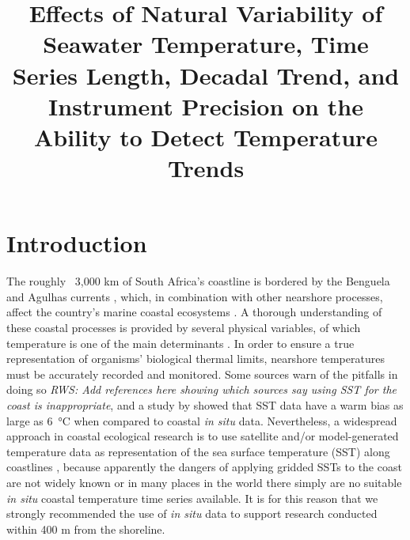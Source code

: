 \documentclass{ametsoc}
\title{Effects of Natural Variability of Seawater Temperature, Time Series Length, Decadal Trend, and Instrument Precision on the Ability to Detect Temperature Trends}
\affiliation{Department of Biodiversity and Conservation Biology, University of the Western Cape, Bellville, Republic of South Africa}
\begin{document}
\maketitle

\section{Introduction}
The roughly ~3,000 km of South Africa's coastline is bordered by the Benguela and Agulhas currents \citep[e.g.][]{Roberts2005,Hutchings2009}, which, in combination with other nearshore processes, affect the country's marine coastal ecosystems \citep{Santos2012a}. A thorough understanding of these coastal processes is provided by several physical variables, of which temperature is one of the main determinants \citep[e.g.][]{Blanchette2008, Tittensor2010, Couce2012}. In order to ensure a true representation of organisms' biological thermal limits, nearshore temperatures must be accurately recorded and monitored. Some sources warn of the pitfalls in doing so \emph{RWS: Add references here showing which sources say using SST for the coast is inappropriate}, and a study by \citet{Smit2013} showed that SST data have a warm bias as large as \SI{6}{\degreeCelsius} when compared to coastal \emph{in situ} data. Nevertheless, a widespread approach in coastal ecological research is to use satellite and/or model-generated temperature data as representation of the sea surface temperature (SST) along coastlines \citep[e.g.][]{Blanchette2008, Broitman2008a, Tyberghein2012}, because apparently the dangers of applying gridded SSTs to the coast are not widely known or in many places in the world there simply are no suitable \emph{in situ} coastal temperature time series available. It is for this reason that we strongly recommended the use of \emph{in situ} data to support research conducted within 400 m from the shoreline.
\end{document}
